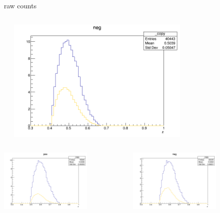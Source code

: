 \begin{frame}{raw counts}
\begin{columns}
\begin{column}[T]{0.25\textwidth}
\end{column}
\begin{column}[T]{0.25\textwidth}
\includegraphics[width = 0.7\textwidth]{results/yield/statistics/yield_x_Q2_z_0.55_4.764_0.50_neg.png}
\end{column}
\end{columns}
\begin{columns}
\begin{column}[T]{0.25\textwidth}
\includegraphics[width = 0.7\textwidth]{results/yield/statistics/yield_x_Q2_z_0.55_4.764_0.60_pos.png}
\end{column}
\begin{column}[T]{0.25\textwidth}
\includegraphics[width = 0.7\textwidth]{results/yield/statistics/yield_x_Q2_z_0.55_4.764_0.60_neg.png}

\end{column}
\end{columns}
\end{frame}
